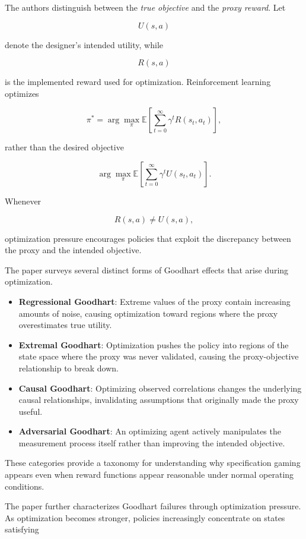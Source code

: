 \documentclass[11pt]{article}
\begin{document}
The authors distinguish between the \emph{true objective} and the \emph{proxy reward}. Let

\[
U(s,a)
\]

denote the designer's intended utility, while

\[
R(s,a)
\]

is the implemented reward used for optimization. Reinforcement learning optimizes

\[
\pi^*
=
\arg\max_\pi
\mathbb{E}
\left[
\sum_{t=0}^{\infty}
\gamma^t
R(s_t,a_t)
\right],
\]

rather than the desired objective

\[
\arg\max_\pi
\mathbb{E}
\left[
\sum_{t=0}^{\infty}
\gamma^t
U(s_t,a_t)
\right].
\]

Whenever

\[
R(s,a)\neq U(s,a),
\]

optimization pressure encourages policies that exploit the discrepancy between the proxy and the intended objective.

The paper surveys several distinct forms of Goodhart effects that arise during optimization.

\begin{itemize}
    \item \textbf{Regressional Goodhart}: Extreme values of the proxy contain increasing amounts of noise, causing optimization toward regions where the proxy overestimates true utility.
    \item \textbf{Extremal Goodhart}: Optimization pushes the policy into regions of the state space where the proxy was never validated, causing the proxy-objective relationship to break down.
    \item \textbf{Causal Goodhart}: Optimizing observed correlations changes the underlying causal relationships, invalidating assumptions that originally made the proxy useful.
    \item \textbf{Adversarial Goodhart}: An optimizing agent actively manipulates the measurement process itself rather than improving the intended objective.
\end{itemize}

These categories provide a taxonomy for understanding why specification gaming appears even when reward functions appear reasonable under normal operating conditions.

The paper further characterizes Goodhart failures through optimization pressure. As optimization becomes stronger, policies increasingly concentrate on states satisfying
\end{document}
